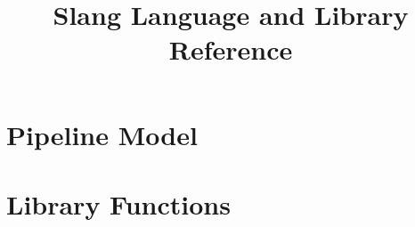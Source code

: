 \documentclass{book}
\title{Slang Language and Library Reference}
\begin{document}
\maketitle
\tableofcontents











\chapter{Pipeline Model}

\chapter{Library Functions}
\end{document}
